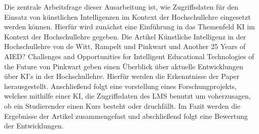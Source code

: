Die zentrale Arbeitsfrage dieser Ausarbeitung ist, wie Zugriffsdaten für den Einsatz von künstlichen Intelligenzen im Kontext der Hochschullehre eingesetzt werden können.
\noindent
Hierfür wird zunächst eine Einführung in das Themenfeld KI im Kontext der Hochschullehre gegeben.
Die Artikel \glqq Künstliche Intelligenz in der Hochschullehre\grqq{} von de Witt, Rampelt und Pinkwart und \glqq Another 25 Years of AIED? Challenges and Opportunities for Intelligent Educational Technologies of the Future\grqq{} von Pinkwart geben einen Überblick über aktuelle Entwicklungen über KI's in der Hochschullehre.
Hierfür werden die Erkenntnisse der Paper herausgestellt.
Anschließend folgt eine vorstellung eines Forschungprojekts, welches mithilfe einer KI, die Zugriffsdaten des \ac{LMS} benutzt um voherzusagen, ob ein Studierender einen Kurs besteht oder druchfällt. 
Im Fazit werden die Ergebnisse der Artikel zusammengefast und abschließend folgt eine Bewertung der Entwicklungen.